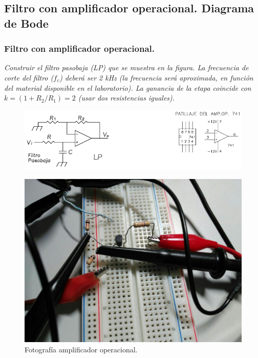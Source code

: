 \documentclass[paper=a4, fontsize=11pt]{scrartcl} %
\numberwithin{equation}{section} %
\numberwithin{figure}{section} %
\numberwithin{table}{section} %
\begin{document}
\subsection{Filtro con amplificador operacional. Diagrama de Bode}

\subsubsection{Filtro con amplificador operacional.}
\textit{Construir el filtro pasobaja (LP) que se muestra en la figura. La frecuencia de corte del filtro ($ f_{c} $)  deberá ser 2 kHz (la frecuencia será aproximada, en función del material disponible en el laboratorio). La ganancia de la etapa coincide con $ k=(1+R_{2}/R_{1})=2 $ (usar dos resistencias iguales).}

\begin{figure}[H]
	\centering
	\includegraphics[scale=1]{image/filtro-baja}
\end{figure}

\begin{figure}[h]
	\centering
	\includegraphics[scale=0.4]{image/practica3-A}
	\caption{Fotografía amplificador operacional.} \label{foto3a}
\end{figure}
\end{document}

